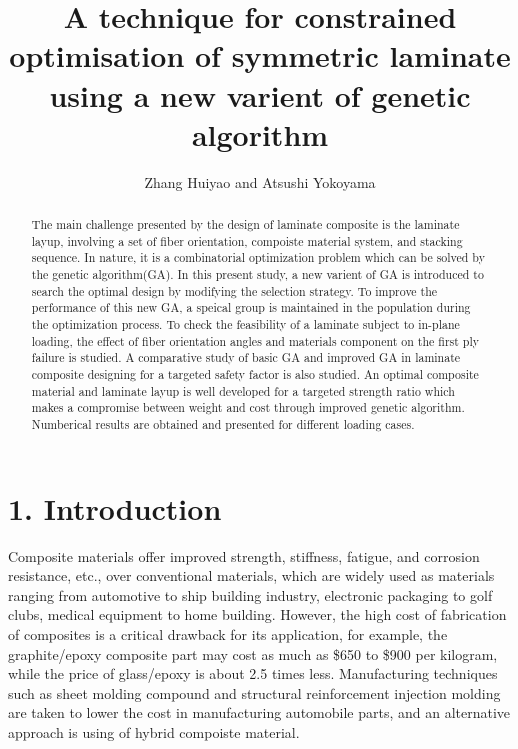 \documentclass[Afour,sagev,times]{sagej}
\begin{document}
\title{A technique for constrained optimisation of symmetric laminate using a new
varient of genetic algorithm}
\author{Zhang Huiyao and
	Atsushi Yokoyama 
}



\begin{abstract}
The main challenge presented by the design of laminate composite is the laminate layup, involving a
set of fiber orientation, compoiste material system, and stacking sequence. In nature, it is a
combinatorial optimization problem which can be solved by the genetic algorithm(GA). In this present
study, a new varient of GA is introduced to search the optimal design by modifying the selection
strategy. To improve the performance of this new GA, a speical group is maintained in the population
during the optimization process.  To check the feasibility of a laminate subject to in-plane
loading, the effect of fiber orientation angles and materials component on the first ply failure
is studied. A comparative study of basic GA and improved GA in laminate composite designing for
a targeted safety factor is also studied.  An optimal composite material and laminate layup is well
developed for a targeted strength ratio which makes a compromise between weight and cost through
improved genetic algorithm. Numberical results are obtained and presented for different loading
cases.
\end{abstract}


\maketitle

\section{1. Introduction}

Composite materials offer improved strength, stiffness, fatigue, and corrosion resistance, etc., over
conventional materials, which are widely used as materials ranging from automotive to ship building
industry, electronic packaging to golf clubs, medical equipment to home building.  However, the high
cost of fabrication of composites is a critical drawback for its application, for example, the
graphite/epoxy composite part may cost as much as \$650 to \$900 per kilogram, while the price of
glass/epoxy is about 2.5 times less. Manufacturing techniques such as sheet molding
compound and structural reinforcement injection molding are taken to lower the cost in manufacturing
automobile parts, and an alternative approach is using of hybrid compoiste material.
\end{document}
